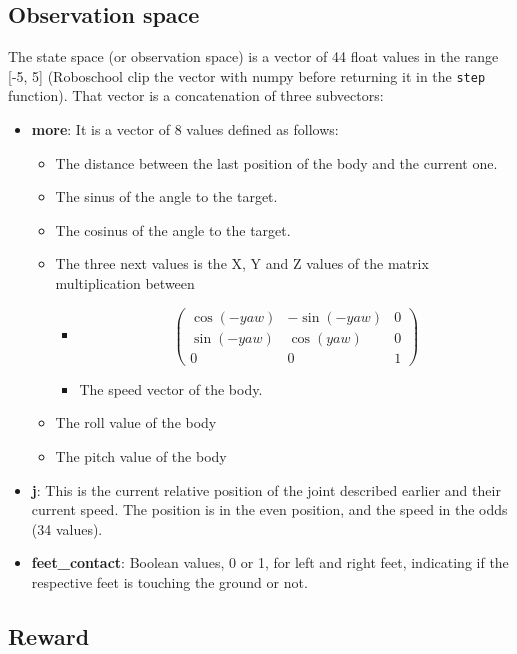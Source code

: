 \documentclass{article}
\begin{document}
\subsection{Observation space}
The state space (or observation space) is a vector of 44 float values in the
range [-5, 5] (Roboschool clip the vector with numpy before returning it in the
\verb?step? function). That vector is a concatenation of three subvectors:
\begin{itemize}
    \item{\textbf{more}: It is a vector of 8 values defined as follows:
        \begin{itemize}
            \item{The distance between the last position of the body and the current one.}
            \item{The sinus of the angle to the target.}
            \item{The cosinus of the angle to the target.}
            \item{The three next values is the X, Y and Z values of the matrix multiplication between
                \begin{itemize}
                   \item{\[\left(
 \begin{matrix}
  \cos(-yaw) & -\sin(-yaw) & 0 \\
  \sin(-yaw) & \cos(yaw) & 0 \\
  0 & 0 & 1
 \end{matrix}\right)
\]}
                   \item{The speed vector of the body.}
                \end{itemize}}
            \item{The roll value of the body}
            \item{The pitch value of the body}
        \end{itemize}}
     \item{\textbf{j}: This is the current relative position of the joint described earlier and their current speed. The position is in the even position, and the speed in the odds (34 values).}
     \item{\textbf{feet\_contact}: Boolean values, 0 or 1, for left and right feet, indicating if the respective feet is touching the ground or not.}
\end{itemize}

\subsection{Reward}
\end{document}
